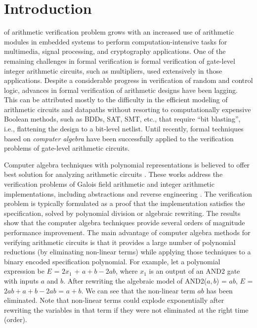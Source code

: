 \section{Introduction}

 of arithmetic verification problem grows with an increased use of arithmetic modules in embedded systems to perform computation-intensive tasks for multimedia, signal processing, and cryptography applications. 
One of the remaining challenges in formal verification is formal verification of gate-level integer arithmetic circuits, such as multipliers, used extensively in those applications. Despite a considerable progress in verification of random and control logic, advances in formal verification of arithmetic designs have been lagging. This can be attributed mostly to the difficulty in the efficient modeling of arithmetic circuits and datapaths without resorting to computationally expensive Boolean methods, such as BDDs, SAT, SMT, etc., that require ``bit blasting'', i.e., flattening the design to a bit-level netlist. Until recently, formal techniques based on \textit{computer algebra} have been successfully applied to the verification problems of gate-level arithmetic circuits.

Computer algebra techniques with polynomial representations is believed to offer best solution for analyzing arithmetic circuits \cite{ciesielski2015verification}\cite{kalla:tcad13}\cite{STABLE:date11}\cite{sayedformal:date-2016}. These works address the verification problems of Galois field arithmetic and integer arithmetic implementations, including abstractions and reverse engineering \cite{STABLE:date11}\cite{sayedformal:date-2016}\cite{ciesielski2015verification}. The verification problem is typically formulated as a proof that the implementation satisfies the specification, solved by polynomial division or algebraic rewriting. The results show that the computer algebra techniques provide several orders of magnitude performance improvement. The main advantage of computer algebra methods for verifying arithmetic circuits is that it provides a large number of polynomial reductions (by eliminating non-linear terms) while applying those techniques to a binary encoded specification polynomial. For example, let a polynomial expression be $E$ = $2x_1$ + $a + b - 2ab$, where $x_1$ is an output of an AND2 gate with inputs $a$ and $b$. After rewriting the algebraic model of AND2($a, b$) = $ab$, $E$ = $2ab + a + b - 2ab$ = $a + b$. We can see that the non-linear term $ab$ has been eliminated. Note that non-linear terms could explode exponentially after rewriting the variables in that term if they were not eliminated at the right time (order).

